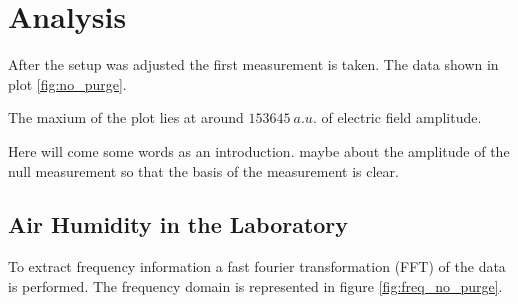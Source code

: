 \chapter{Analysis}
\label{cha:analysis}

After the setup was adjusted the first measurement is taken. The data shown in plot \ref{fig:no_purge}. 



The maxium of the plot lies at around $\qty{153645}{a.u.}$ of electric field amplitude.

Here will come some words as an introduction. maybe about the amplitude of the null measurement so that the basis of the measurement is clear.

\section{Air Humidity in the Laboratory}
\label{sec:water_abso}
To extract frequency information a fast fourier transformation (FFT) of the data is performed. The frequency domain is represented in figure \ref{fig:freq_no_purge}.

